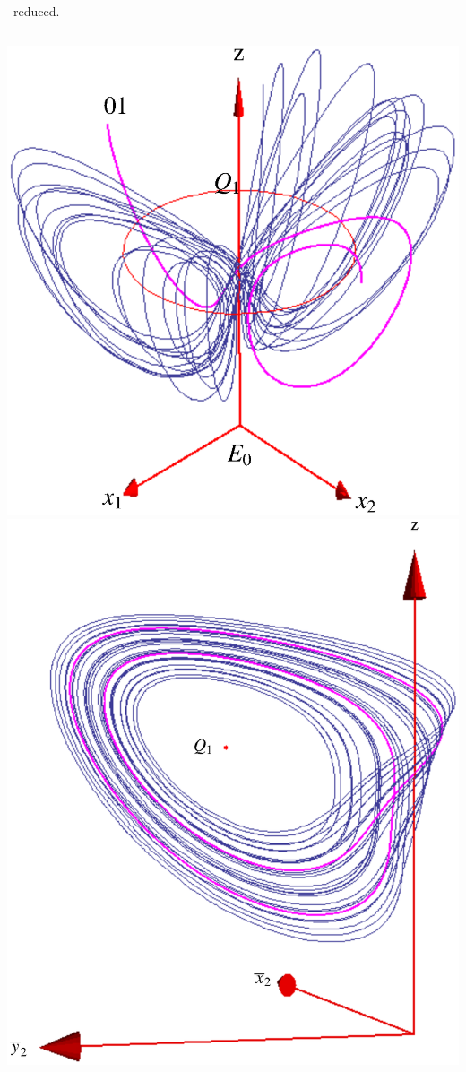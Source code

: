 \documentclass{beamer}
\begin{document}
\begin{frame}{\CLe\ reduced.}
\begin{columns}
		\includegraphics[width=.9\textwidth]{../../figs/CLEsym2.eps}
		\includegraphics[width=.9\textwidth]{../../figs/CLEinvXYZdefense}
\end{columns}

 
\end{frame}
\end{document}
